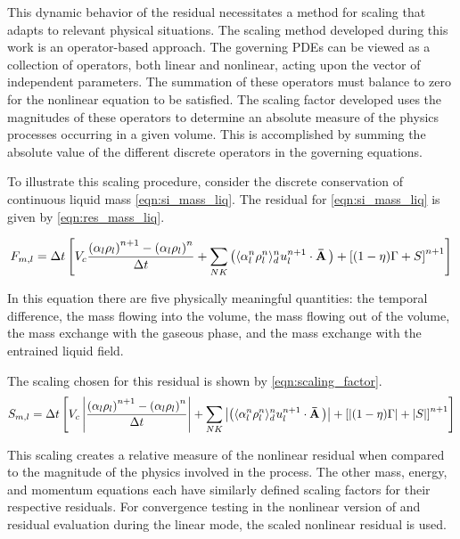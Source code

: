 This dynamic behavior of the residual necessitates a method for scaling that adapts to relevant physical situations.
The scaling method developed during this work is an operator-based approach.
The governing PDEs can be viewed as a collection of operators, both linear and nonlinear, acting upon the vector of independent parameters.
The summation of these operators must balance to zero for the nonlinear equation to be satisfied.
The scaling factor developed uses the magnitudes of these operators to determine an absolute measure of the physics processes occurring in a given volume.
This is accomplished by summing the absolute value of the different discrete operators in the governing equations. 

To illustrate this scaling procedure, consider the discrete conservation of continuous liquid mass \eqref{eqn:si_mass_liq}.
The residual for \eqref{eqn:si_mass_liq} is given by \eqref{eqn:res_mass_liq}.

\begin{equation}
\label{eqn:res_mass_liq}
F_{m,l} = \Delta t \left[ V_c \frac{\left(\alpha_l \rho_l \right)^{n+1} - \left(\alpha_l \rho_l \right)^{n}}{\Delta t} + \sum_{NK}\left( \don{\alpha^n_l \rho^n_l}^{n}_{d} u^{n+1}_l  \cdot \vec{\bar{A}}\right) + \left[(1-\eta)\Gamma + S \right]^{n+1}\right]
\end{equation}

In this equation there are five physically meaningful quantities: the temporal difference, the mass flowing into the volume, the mass flowing out of the volume, the mass exchange with the gaseous phase, and the mass exchange with the entrained liquid field.

The scaling chosen for this residual is shown by \eqref{eqn:scaling_factor}.
\begin{equation}
\label{eqn:scaling_factor}
S_{m,l} = \Delta t \left[ V_c \abs{\frac{\left(\alpha_l \rho_l \right)^{n+1} - \left(\alpha_l \rho_l \right)^{n}}{\Delta t}} + \sum_{NK}\abs{\left( \don{\alpha^n_l \rho^n_l}^{n}_{d} u^{n+1}_l  \cdot \vec{\bar{A}}\right)} + \left[\abs{(1-\eta)\Gamma} + \abs{S} \right]^{n+1}\right]
\end{equation}

This scaling creates a relative measure of the nonlinear residual when compared to the magnitude of the physics involved in the process.
The other mass, energy, and momentum equations each have similarly defined scaling factors for their respective residuals.
For convergence testing in the nonlinear version of \cobra{} and residual evaluation during the linear mode, the scaled nonlinear residual is used.

